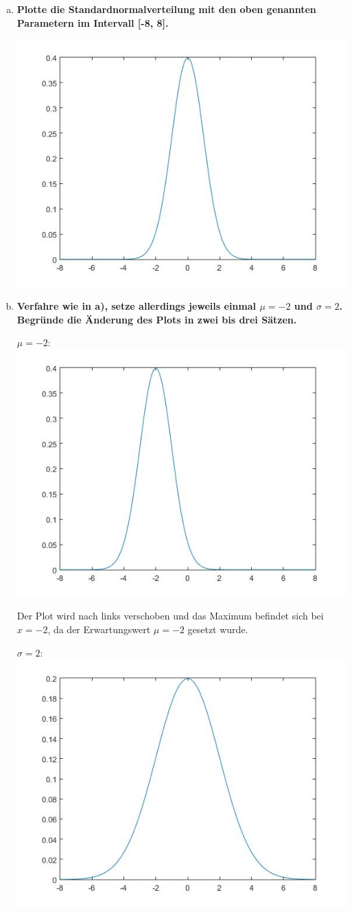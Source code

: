 \documentclass[a4paper]{scrartcl}
\begin{document}
\begin{enumerate}[a)]
	\item \textbf{Plotte die Standardnormalverteilung mit den oben genannten Parametern im Intervall [-8, 8].}
		
	\includegraphics[width=.6\textwidth]{plots/2a_mu0_sigma1.jpg}
		
	
	\item \textbf{Verfahre wie in a), setze allerdings jeweils einmal $\mu = -2$ und $\sigma = 2$. Begründe die Änderung des Plots in zwei bis drei Sätzen.}
	
	$\mu = -2$:\\
	\includegraphics[width=.6\textwidth]{plots/2b_mu-2_sigma1.jpg}
	
	Der Plot wird nach links verschoben und das Maximum befindet sich bei $x=-2$, da der Erwartungswert $\mu = -2$ gesetzt wurde. 
	
	$\sigma = 2$:\\
	\includegraphics[width=.6\textwidth]{plots/2b_mu0_sigma2.jpg}
	

\end{enumerate}
\end{document}
